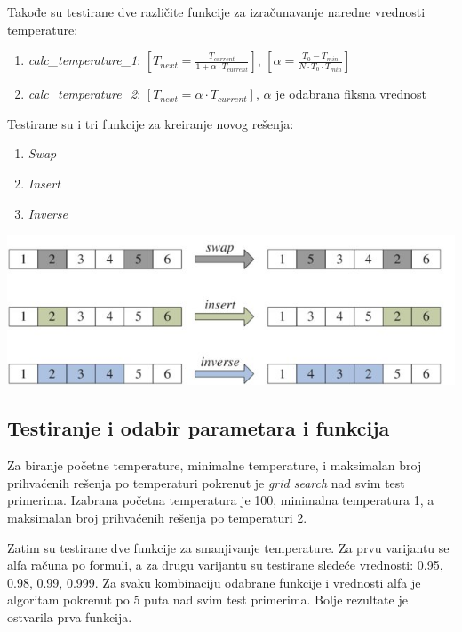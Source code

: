 \documentclass[12pt, a4paper]{article}
\begin{document}
Takođe su testirane dve različite funkcije za izračunavanje naredne vrednosti temperature:
\begin{enumerate}
	\item \textit{calc\_temperature\_1}:  $[  T_{next} = \frac{T_{current}}{1 + \alpha \cdot T_{current}} ]$, $[\alpha = \frac{T_0 - T_{min}}{N \cdot T_0 \cdot T_{min}}]$

	\item \textit{calc\_temperature\_2}: $[T_{next} = \alpha \cdot T_{current} ]$, $ \alpha$ je odabrana fiksna vrednost
\end{enumerate}

Testirane su i tri funkcije za kreiranje novog rešenja:
\begin{enumerate}
	\item \textit{Swap}
	\item \textit{Insert}
	\item \textit{Inverse} 
\end{enumerate}


\vspace{0.5cm}
\begin{center}
  \hspace{1cm}
  \includegraphics[width=0.8\linewidth]{img/make_sc_funs.jpg}
  \hspace{1cm} 
\end{center}
\vspace{0.5cm}

\subsection{Testiranje i odabir parametara i funkcija}
Za biranje početne temperature, minimalne temperature, i maksimalan broj prihvaćenih rešenja po temperaturi pokrenut je \textit{grid search} nad svim test primerima. Izabrana početna temperatura je 100, minimalna temperatura 1, a maksimalan broj prihvaćenih rešenja po temperaturi 2.

Zatim su testirane dve funkcije za smanjivanje temperature. Za prvu varijantu se alfa računa po formuli, a za drugu varijantu su testirane sledeće vrednosti: 0.95, 0.98, 0.99, 0.999. Za svaku kombinaciju odabrane funkcije i vrednosti alfa je algoritam pokrenut po 5 puta nad svim test primerima. Bolje rezultate je ostvarila prva funkcija.
\end{document}
